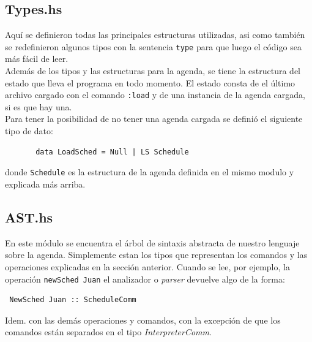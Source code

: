 \documentclass[a4paper,12pt]{article}
\begin{document}
      \subsection*{Types.hs}
       Aquí se definieron todas las principales estructuras utilizadas, asi como también se redefinieron algunos tipos con la sentencia \texttt{type} para que luego el código sea más fácil de leer.\\
       Además de los tipos y las estructuras para la agenda, se tiene la estructura del estado que lleva el programa en todo momento. El estado consta de el último archivo cargado con el comando \texttt{:load}
       y de una instancia de la agenda cargada, si es que hay una. \\ 
       Para tener la posibilidad de no tener una agenda cargada se definió el siguiente tipo de dato:
       \begin{verbatim}
       data LoadSched = Null | LS Schedule
       \end{verbatim}
       donde \texttt{Schedule} es la estructura de la agenda definida en el mismo modulo y explicada más arriba.

       \subsection*{AST.hs}
       En este módulo se encuentra el árbol de sintaxis abstracta de nuestro lenguaje sobre la agenda.
       Simplemente estan los tipos que representan los comandos y las operaciones explicadas en la sección
       anterior. Cuando se lee, por ejemplo, la operación \texttt{newSched Juan} el analizador o \textit{parser}
       devuelve algo de la forma: \begin{verbatim} NewSched Juan :: ScheduleComm \end{verbatim} Idem. con las demás operaciones y comandos, con la excepción de que los comandos están separados en el tipo \textit{InterpreterComm}.

       \subsection*{}
\end{document}
